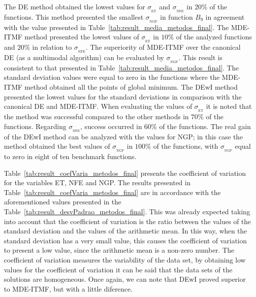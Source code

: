 \documentclass[smallextended]{svjour3}       %
\begin{document}
The DE method obtained the lowest values for $\sigma_{ _{\text{ET}}}$ and $\sigma_{ _{\text{NFE}}}$ in $20\%$ of the functions. This method presented the smallest $\sigma_{ _{\text{NGP}}}$ in function $B_{9}$ in agreement with the value presented in Table~\ref{tab:result_media_metodos_final}. The MDE-ITMF method presented the lowest values of $\sigma_{ _{\text{ET}}}$ in $10\%$ of the analyzed functions and $20\%$ in relation to $\sigma_{ _{\text{NFE}}}$. The superiority of MDE-ITMF over the canonical DE (as a multimodal algorithm) can be evaluated by $\sigma_{ _{\text{NGP}}}$. This result is consistent to that presented in Table~\ref{tab:result_media_metodos_final}. The standard deviation values were equal to zero in the functions where the MDE-ITMF method obtained all the points of global minimum. The DEwI method presented the lowest values for the standard deviations in comparison with the canonical DE and MDE-ITMF. When evaluating the values of $\sigma_{ _{\text{ET}}}$ it is noted that the method was successful compared to the other methods in $70\%$ of the functions. Regarding $\sigma_{ _{\text{NFE}}}$, success occurred in $60\%$ of the functions. The real gain of the DEwI method can be analyzed with the values for NGP; in this case the method obtained the best values of $\sigma_{ _{\text{NGP}}}$ in $100\%$ of the functions, with $\sigma_{ _{\text{NGP}}}$ equal to zero in eight of ten benchmark functions.

Table~\ref{tab:result_coefVaria_metodos_final} presents the coefficient of variation for the variables ET, NFE and NGP. The results presented in Table~\ref{tab:result_coefVaria_metodos_final} are in accordance with the aforementioned values presented in the Table~\ref{tab:result_desvPadrao_metodos_final}. This was already expected taking into account that the coefficient of variation is the ratio between the values of the standard deviation and the values of the arithmetic mean. In this way, when the standard deviation has a very small value, this causes the coefficient of variation to present a low value, since the arithmetic mean is a non-zero number. The coefficient of variation measures the variability of the data set, by obtaining low values for the coefficient of variation it can be said that the data sets of the solutions are homogeneous. Once again, we can note that DEwI proved superior to MDE-ITMF, but with a little diference.
\end{document}
